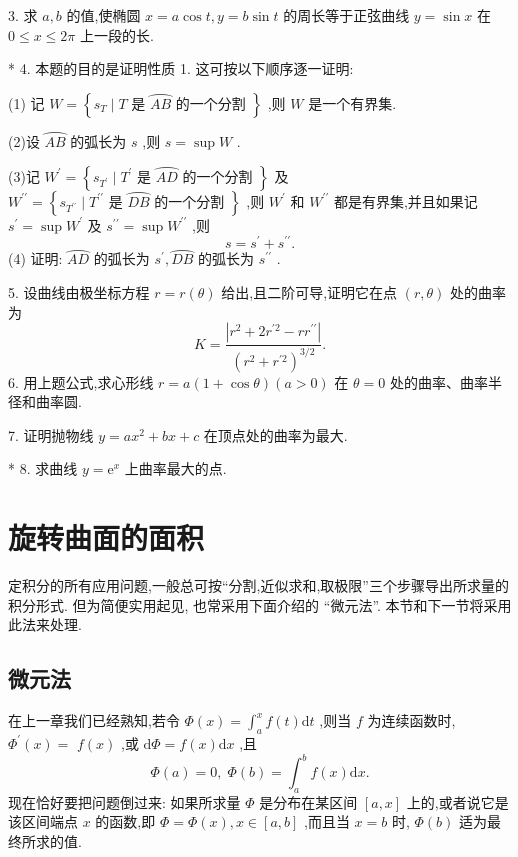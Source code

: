 3. 求 \(a,b\) 的值,使椭圆 \(x = a\cos t,y = b\sin t\) 的周长等于正弦曲线 \(y = \sin x\) 在 \(0 \leq  x \leq  {2\pi }\) 上一段的长.

* 4. 本题的目的是证明性质 1. 这可按以下顺序逐一证明:

(1) 记 \(W = \left\{  {{s}_{T} \mid  T\text{ 是 }\overset{⏜}{AB}\text{ 的一个分割 }}\right\}\) ,则 \(W\) 是一个有界集.

(2)设 \(\overset{⏜}{AB}\) 的弧长为 \(s\) ,则 \(s = \sup W\) .

(3)记 \({W}^{\prime } = \left\{  {{s}_{{T}^{\prime }} \mid  {T}^{\prime }\text{ 是 }\overset{⏜}{AD}\text{ 的一个分割 }}\right\}\) 及 \({W}^{\prime \prime } = \left\{  {{s}_{{T}^{\prime \prime }} \mid  {T}^{\prime \prime }\text{ 是 }\overset{⏜}{DB}\text{ 的一个分割 }}\right\}\) ,则 \({W}^{\prime }\) 和 \({W}^{\prime \prime }\) 都是有界集,并且如果记 \({s}^{\prime } = \sup {W}^{\prime }\) 及 \({s}^{\prime \prime } = \sup {W}^{\prime \prime }\) ,则
\[
s = {s}^{\prime } + {s}^{\prime \prime }.
\]
(4) 证明: \(\overset{⏜}{AD}\) 的弧长为 \({s}^{\prime },\overset{⏜}{DB}\) 的弧长为 \({s}^{\prime \prime }\) .

5. 设曲线由极坐标方程 \(r = r\left( \theta \right)\) 给出,且二阶可导,证明它在点 \(\left( {r,\theta }\right)\) 处的曲率为
\[
K = \frac{\left| {r}^{2} + 2{r}^{\prime 2} - r{r}^{\prime \prime }\right| }{{\left( {r}^{2} + {r}^{\prime 2}\right) }^{3/2}}.
\]
6. 用上题公式,求心形线 \(r = a\left( {1 + \cos \theta }\right) \left( {a > 0}\right)\) 在 \(\theta  = 0\) 处的曲率、曲率半径和曲率圆.

7. 证明抛物线 \(y = a{x}^{2} + {bx} + c\) 在顶点处的曲率为最大.

* 8. 求曲线 \(y = {\mathrm{e}}^{x}\) 上曲率最大的点.

\section{旋转曲面的面积}

定积分的所有应用问题,一般总可按“分割,近似求和,取极限”三个步骤导出所求量的积分形式. 但为简便实用起见, 也常采用下面介绍的 “微元法”. 本节和下一节将采用此法来处理.

\subsection{微元法}

在上一章我们已经熟知,若令 \(\Phi \left( x\right)  = {\int }_{a}^{x}f\left( t\right) \mathrm{d}t\) ,则当 \(f\) 为连续函数时, \({\Phi }^{\prime }\left( x\right)  =\)  \(f\left( x\right)\) ,或 \(\mathrm{d}\Phi  = f\left( x\right) \mathrm{d}x\) ,且
\[
\Phi \left( a\right)  = 0,\;\Phi \left( b\right)  = {\int }_{a}^{b}f\left( x\right) \mathrm{d}x.
\]
现在恰好要把问题倒过来: 如果所求量 \(\Phi\) 是分布在某区间 \(\left\lbrack  {a,x}\right\rbrack\) 上的,或者说它是该区间端点 \(x\) 的函数,即 \(\Phi  = \Phi \left( x\right) ,x \in  \left\lbrack  {a,b}\right\rbrack\) ,而且当 \(x = b\) 时, \(\Phi \left( b\right)\) 适为最终所求的值.

